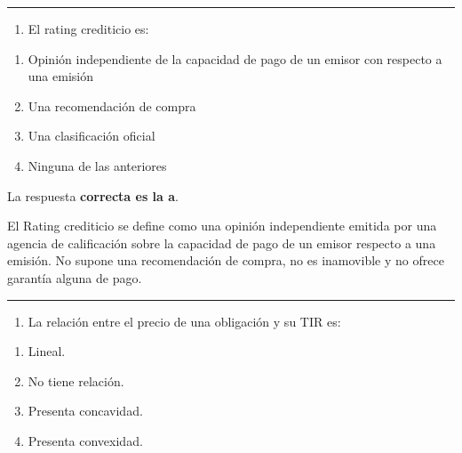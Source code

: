 \documentclass[
  letterpaper,
  DIV=11,
  numbers=noendperiod]{scrreprt}
\providecommand{\tightlist}{%
  \setlength{\itemsep}{0pt}\setlength{\parskip}{0pt}}\usepackage{longtable,booktabs,array}
\begin{document}
\begin{center}\rule{0.5\linewidth}{0.5pt}\end{center}

\begin{enumerate}
\def\labelenumi{\arabic{enumi}.}
\setcounter{enumi}{83}
\tightlist
\item
  El rating crediticio es:
\end{enumerate}

\begin{enumerate}
\def\labelenumi{\alph{enumi})}
\item
  Opinión independiente de la capacidad de pago de un emisor con
  respecto a una emisión
\item
  Una recomendación de compra
\item
  Una clasificación oficial
\item
  Ninguna de las anteriores
\end{enumerate}

\begin{tcolorbox}[enhanced jigsaw, left=2mm, opacityback=0, colback=white, breakable, arc=.35mm, bottomrule=.15mm, rightrule=.15mm, toprule=.15mm, leftrule=.75mm, colframe=quarto-callout-tip-color-frame]
\begin{minipage}[t]{5.5mm}
\textcolor{quarto-callout-tip-color}{\faLightbulb}
\end{minipage}%
\begin{minipage}[t]{\textwidth - 5.5mm}

La respuesta \textbf{correcta es la a}.

El Rating crediticio se define como una opinión independiente emitida
por una agencia de calificación sobre la capacidad de pago de un emisor
respecto a una emisión. No supone una recomendación de compra, no es
inamovible y no ofrece garantía alguna de pago.

\end{minipage}%
\end{tcolorbox}

\begin{center}\rule{0.5\linewidth}{0.5pt}\end{center}

\begin{enumerate}
\def\labelenumi{\arabic{enumi}.}
\setcounter{enumi}{84}
\tightlist
\item
  La relación entre el precio de una obligación y su TIR es:
\end{enumerate}

\begin{enumerate}
\def\labelenumi{\alph{enumi})}
\item
  Lineal.
\item
  No tiene relación.
\item
  Presenta concavidad.
\item
  Presenta convexidad.
\end{enumerate}
\end{document}
